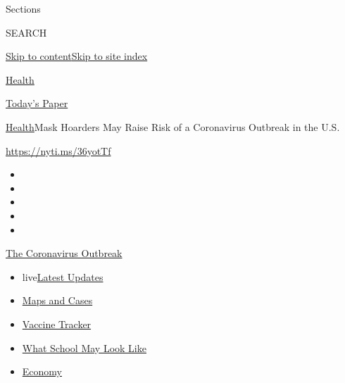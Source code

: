 Sections

SEARCH

\protect\hyperlink{site-content}{Skip to
content}\protect\hyperlink{site-index}{Skip to site index}

\href{https://www.nytimes.com/section/health}{Health}

\href{https://myaccount.nytimes.com/auth/login?response_type=cookie\&client_id=vi}{}

\href{https://www.nytimes.com/section/todayspaper}{Today's Paper}

\href{/section/health}{Health}\textbar{}Mask Hoarders May Raise Risk of
a Coronavirus Outbreak in the U.S.

\url{https://nyti.ms/36yotTf}

\begin{itemize}
\item
\item
\item
\item
\item
\end{itemize}

\href{https://www.nytimes.com/news-event/coronavirus?action=click\&pgtype=Article\&state=default\&region=TOP_BANNER\&context=storylines_menu}{The
Coronavirus Outbreak}

\begin{itemize}
\tightlist
\item
  live\href{https://www.nytimes.com/2020/08/02/world/coronavirus-updates.html?action=click\&pgtype=Article\&state=default\&region=TOP_BANNER\&context=storylines_menu}{Latest
  Updates}
\item
  \href{https://www.nytimes.com/interactive/2020/us/coronavirus-us-cases.html?action=click\&pgtype=Article\&state=default\&region=TOP_BANNER\&context=storylines_menu}{Maps
  and Cases}
\item
  \href{https://www.nytimes.com/interactive/2020/science/coronavirus-vaccine-tracker.html?action=click\&pgtype=Article\&state=default\&region=TOP_BANNER\&context=storylines_menu}{Vaccine
  Tracker}
\item
  \href{https://www.nytimes.com/interactive/2020/07/29/us/schools-reopening-coronavirus.html?action=click\&pgtype=Article\&state=default\&region=TOP_BANNER\&context=storylines_menu}{What
  School May Look Like}
\item
  \href{https://www.nytimes.com/live/2020/07/31/business/stock-market-today-coronavirus?action=click\&pgtype=Article\&state=default\&region=TOP_BANNER\&context=storylines_menu}{Economy}
\end{itemize}

